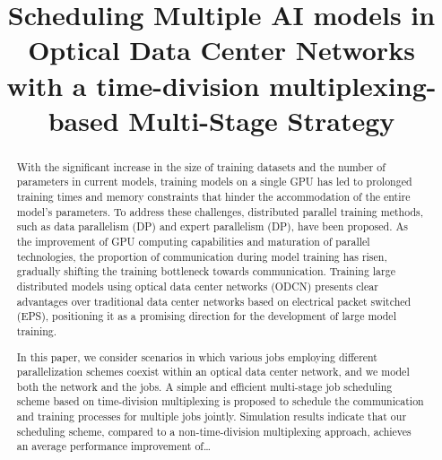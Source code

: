 \documentclass[conference]{IEEEtran}
\begin{document}
\title{Scheduling Multiple AI models in Optical Data Center Networks with a time-division multiplexing-based Multi-Stage Strategy\\
}

\author{
	}

\maketitle

\begin{abstract}
With the significant increase in the size of training datasets and the number of parameters in current models, training models on a single GPU has led to prolonged training times and memory constraints that hinder the accommodation of the entire model's parameters. To address these challenges, distributed parallel training methods, such as data parallelism (DP) and expert parallelism (DP), have been proposed. As the improvement of GPU computing capabilities and maturation of parallel technologies, the proportion of communication during model training has risen, gradually shifting the training bottleneck towards communication. Training large distributed models using optical data center networks (ODCN) presents clear advantages over traditional data center networks based on electrical packet switched (EPS), positioning it as a promising direction for the development of large model training.

In this paper, we consider scenarios in which various jobs employing different parallelization schemes coexist within an optical data center network, and we model both the network and the jobs. A simple and efficient multi-stage job scheduling scheme based on time-division multiplexing is proposed to schedule the communication and training processes for multiple jobs jointly. Simulation results indicate that our scheduling scheme, compared to a non-time-division multiplexing approach, achieves an average performance improvement of…
\end{abstract}
\end{document}
